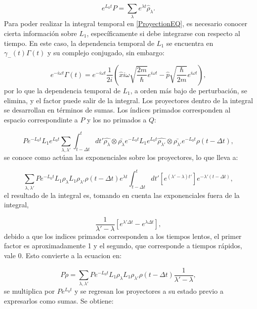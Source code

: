 \documentclass[a4paper,10pt]{report}
\begin{document}
\begin{equation}
e^{L_0 t} P = \sum_\lambda e^{\lambda t} \hat{\rho}_\lambda.
\end{equation} Para poder realizar la integral temporal en \ref{ProyectionEQ}, es necesario conocer cierta información sobre $L_1$, específicamente si debe integrarse con respecto al tiempo. En este caso, la dependencia temporal de $L_1$ se encuentra en $\gamma_-(t)\Gamma(t)$ y su complejo conjugado, sin embargo:

\begin{equation}
e^{-i\omega t}\Gamma(t) = e^{-i\omega t}\frac{1}{2i}(\hat{x}i\omega \sqrt{\frac{2m}{\hbar}}e^{i\omega t}-\hat{p}\sqrt{\frac{\hbar}{2m}}e^{i\omega t}), 
\end{equation}por lo que la dependencia temporal de $L_1$, a orden más bajo de perturbación, se elimina, y el factor puede salir de la integral. Los proyectores dentro de la integral se desarrollan en términos de sumas. Los índices primados corresponden al espacio correspondinte a $P$ y los no primados a $Q$:

\begin{equation}
P e^{-L_0 t}L_1e^{L_0 t}\sum_{\lambda ,\lambda'}\int_{t-\Delta t}^{t}dt'\hat{\rho_\lambda}\otimes\bar{\rho_\lambda}e^{-L_0 t}L_1e^{L_0 t}\hat{\rho_{\lambda'}}\otimes\bar{\rho_{\lambda'}}e^{-L_0 t}\rho(t-\Delta t),
\end{equation} se conoce como actúan las exponenciales sobre los proyectores, lo que lleva a:

\begin{equation}
\sum_{\lambda ,\lambda'} P e^{-L_0 t} L_1 \rho_{\lambda} L_1 \rho_{\lambda'} \rho(t-\Delta t) e^{\lambda t} \int_{t-\Delta t}^{t} dt'[ e^{(\lambda'-\lambda)t'}] e^{-\lambda'(t-\Delta t)},
\end{equation} el resultado de la integral es, tomando en cuenta las exponenciales fuera de la integral,

\begin{equation}
\frac{1}{\lambda' - \lambda} [e^{\lambda' \Delta t}-e^{\lambda \Delta t}],
\end{equation} debido a que los indices primados corresponden a los tiempos lentos, el primer factor es aproximadamente 1 y el segundo, que corresponde a tiempos rápidos, vale 0. Esto convierte a la ecuacion en:

\begin{equation}
P\dot{\rho}=\sum_{\lambda ,\lambda'} P e^{-L_0 t} L_1 \rho_{\lambda} L_1 \rho_{\lambda'} \rho(t-\Delta t)\frac{1}{\lambda' - \lambda} ,
\end{equation} se multiplica por $Pe^{L_0 t}$ y se regresan los proyectores a su estado previo a expresarlos como sumas. Se obtiene:
\end{document}
